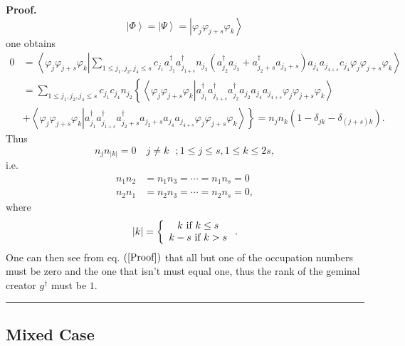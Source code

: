 \documentclass[aps,preprint]{revtex4}%
\newenvironment{proof}[1][Proof]{\noindent\textbf{#1.} }{\ \rule{0.5em}{0.5em}}
\begin{document}
\begin{proof}
\begin{equation}
\left\vert \Phi\right\rangle =\left\vert \Psi\right\rangle =\left\vert
\varphi_{j}\varphi_{j+s}\varphi_{k}\right\rangle
\end{equation}
one obtains
\begin{align}
0  &  =\left\langle \varphi_{j}\varphi_{j+s}\varphi_{k}\left\vert \sum_{1\leq
j_{1},j_{2},j_{4}\leq s}c_{j_{1}}a_{j_{1}}^{\dagger}a_{j_{1+s}}^{\dagger
}n_{j_{2}}\left(  a_{j_{2}}^{\dagger}a_{j_{2}}+a_{j_{2}+s}^{\dagger}%
a_{j_{2}+s}\right)  a_{j_{4}}a_{j_{4+s}}c_{j_{4}}\varphi_{j}\varphi
_{j+s}\varphi_{k}\right.  \right\rangle \nonumber\\
&  =\sum_{1\leq j_{1},j_{2},j_{4}\leq s}c_{j_{1}}c_{j_{4}}n_{j_{2}}\left\{
\left\langle \varphi_{j}\varphi_{j+s}\varphi_{k}\left\vert a_{j_{1}}^{\dagger
}a_{j_{1+s}}^{\dagger}a_{j_{2}}^{\dagger}a_{j_{2}}a_{j_{4}}a_{j_{4+s}}%
\varphi_{j}\varphi_{j+s}\varphi_{k}\right.  \right\rangle \right. \nonumber\\
&  \left.  +\right.  \left.  \left\langle \varphi_{j}\varphi_{j+s}\varphi
_{k}\left\vert a_{j_{1}}^{\dagger}a_{j_{1+s}}^{\dagger}a_{j_{2}+s}^{\dagger
}a_{j_{2}+s}a_{j_{4}}a_{j_{4+s}}\varphi_{j}\varphi_{j+s}\varphi_{k}\right.
\right\rangle \right\}  =n_{j}n_{k}\left(  1-\delta_{jk}-\delta_{\left(
j+s\right)  k}\right)  .
\end{align}
Thus
\begin{equation}
n_{j}n_{\left\vert k\right\vert }=0\quad j\neq k\text{ };1\leq j\leq s,1\leq
k\leq2s,
\end{equation}
i.e.
\begin{align}
n_{1}n_{2}  &  =n_{1}n_{3}=\cdots=n_{1}n_{s}=0\nonumber\\
n_{2}n_{1}  &  =n_{2}n_{3}=\cdots=n_{2}n_{s}=0, \label{Proof}%
\end{align}
where
\begin{equation}
\left\vert k\right\vert =\left\{
\begin{array}
[c]{c}%
k\text{ if }k\leq s\\
k-s\text{ if }k>s
\end{array}
\right.  .
\end{equation}
One can then see from eq. $\left(  \ref{Proof}\right)  $ that all but one of
the occupation numbers must be zero and the one that isn't must equal one,
thus the rank of the geminal creator $g^{\dagger}$ must be $1.$
\end{proof}

\subsection{Mixed Case}
\end{document}

